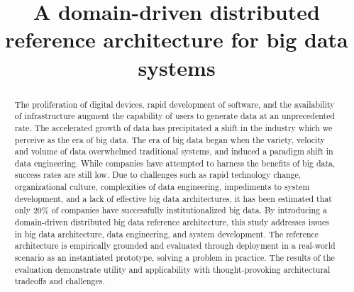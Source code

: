 \documentclass[conference]{IEEEtran}
\begin{document}
\title{A domain-driven distributed reference
architecture for big data systems\\
}

\author{
\and
{}

}

\maketitle

 
\begin{abstract}
    The proliferation of digital devices, rapid development of software, and the availability of infrastructure augment the capability of users to generate data at an unprecedented rate. The accelerated growth of data has precipitated a shift in the industry which we perceive as the era of big data.  The era of big data began when the variety, velocity and volume of data overwhelmed traditional systems, and induced a paradigm shift in data engineering. While companies have attempted to harness the benefits of big data, success rates are still low. Due to challenges such as rapid technology change, organizational culture, complexities of data engineering, impediments to system development, and a lack of effective big data architectures, it has been estimated that only 20\% of companies have successfully institutionalized big data. By introducing a domain-driven distributed big data reference architecture, this study addresses issues in big data architecture, data engineering, and system development. The reference architecture is empirically grounded and evaluated through deployment in a real-world scenario as an instantiated prototype, solving a problem in practice. The results of the evaluation demonstrate utility and applicability with thought-provoking architectural tradeoffs and challenges.
\end{abstract}
\end{document}
